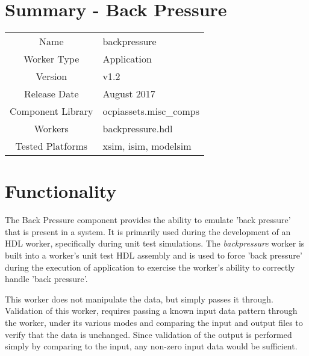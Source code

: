 \documentclass{article}
\author{} %
\date{Version \docVersion} %
\title{\docTitle}
\def\docVersion{1.2}
\def\comp{backpressure}
\def\Comp{Back Pressure}
\begin{document}
\section*{Summary - \Comp}
\begin{tabular}{|c|M{13.5cm}|}
	\hline
	                  &                                                                                \\
	\hline
	Name              & \comp                                                                          \\
	\hline
	Worker Type       & Application                                                                    \\
	\hline
	Version           & v\docVersion \\
	\hline
	Release Date      & August 2017 \\
	\hline
	Component Library & ocpiassets.misc\_comps                                                         \\
	\hline
	Workers           & \comp.hdl                                                            \\
	\hline
	Tested Platforms  & xsim, isim, modelsim\\
	\hline
\end{tabular}

\section*{Functionality}
\begin{flushleft}
	The Back Pressure component provides the ability to emulate 'back pressure'
that is present in a system. It is primarily used during the development of an HDL worker,
specifically during unit test simulations. The \textit{backpressure} worker is built
into a worker's unit test HDL assembly and is used to force 'back pressure'
during the execution of application to exercise the worker's ability to correctly handle
'back pressure'.\medskip

	This worker does not manipulate the data, but simply passes it through.
Validation of this worker, requires passing a known input data pattern
through the worker, under its various modes and comparing the input and
output files to verify that the data is unchanged. Since validation of the
output is performed simply by comparing to the input, any non-zero input
data would be sufficient.\medskip
\end{flushleft}
\end{document}
